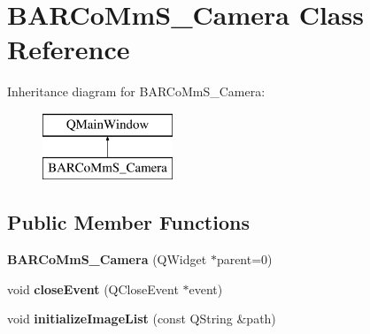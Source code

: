 \hypertarget{class_b_a_r_co_mm_s___camera}{}\section{B\+A\+R\+Co\+Mm\+S\+\_\+\+Camera Class Reference}
\label{class_b_a_r_co_mm_s___camera}
Inheritance diagram for B\+A\+R\+Co\+Mm\+S\+\_\+\+Camera\+:\begin{figure}[H]
\begin{center}
\leavevmode
\includegraphics[height=2.000000cm]{class_b_a_r_co_mm_s___camera}
\end{center}
\end{figure}
\subsection*{Public Member Functions}
\begin{DoxyCompactItemize}
\item 
{\bfseries B\+A\+R\+Co\+Mm\+S\+\_\+\+Camera} (Q\+Widget $\ast$parent=0)\hypertarget{class_b_a_r_co_mm_s___camera_a82305edb0c24e3a15520e592fb09d322}{}\label{class_b_a_r_co_mm_s___camera_a82305edb0c24e3a15520e592fb09d322}

\item 
void {\bfseries close\+Event} (Q\+Close\+Event $\ast$event)\hypertarget{class_b_a_r_co_mm_s___camera_a50fddeb61c65a113a47961ab657f39ea}{}\label{class_b_a_r_co_mm_s___camera_a50fddeb61c65a113a47961ab657f39ea}

\item 
void {\bfseries initialize\+Image\+List} (const Q\+String \&path)\hypertarget{class_b_a_r_co_mm_s___camera_a74572bf6c446ca33767f04937d8cb709}{}\label{class_b_a_r_co_mm_s___camera_a74572bf6c446ca33767f04937d8cb709}

\end{DoxyCompactItemize}
